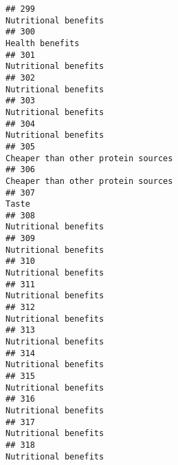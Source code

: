\documentclass[
]{article}
\begin{document}
\begin{verbatim}
## 299                                                                                                       Nutritional benefits
## 300                                                                                                            Health benefits
## 301                                                                                                       Nutritional benefits
## 302                                                                                                       Nutritional benefits
## 303                                                                                                       Nutritional benefits
## 304                                                                                                       Nutritional benefits
## 305                                                                                         Cheaper than other protein sources
## 306                                                                                         Cheaper than other protein sources
## 307                                                                                                                      Taste
## 308                                                                                                       Nutritional benefits
## 309                                                                                                       Nutritional benefits
## 310                                                                                                       Nutritional benefits
## 311                                                                                                       Nutritional benefits
## 312                                                                                                       Nutritional benefits
## 313                                                                                                       Nutritional benefits
## 314                                                                                                       Nutritional benefits
## 315                                                                                                       Nutritional benefits
## 316                                                                                                       Nutritional benefits
## 317                                                                                                       Nutritional benefits
## 318                                                                                                       Nutritional benefits

\end{verbatim}
\end{document}
